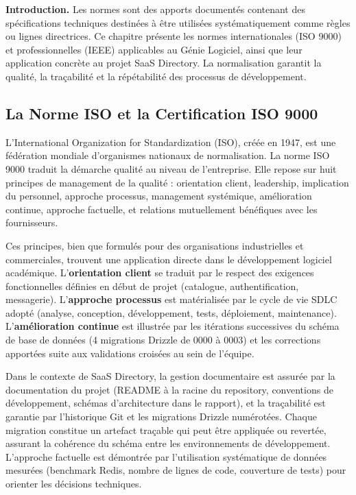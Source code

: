 \textbf{Introduction.} Les normes sont des apports documentés contenant des spécifications techniques destinées à être utilisées systématiquement comme règles ou lignes directrices. Ce chapitre présente les normes internationales (ISO 9000) et professionnelles (IEEE) applicables au Génie Logiciel, ainsi que leur application concrète au projet SaaS Directory. La normalisation garantit la qualité, la traçabilité et la répétabilité des processus de développement.

\subsection{La Norme ISO et la Certification ISO 9000}

L'International Organization for Standardization (ISO), créée en 1947, est une fédération mondiale d'organismes nationaux de normalisation. La norme ISO 9000 traduit la démarche qualité au niveau de l'entreprise. Elle repose sur huit principes de management de la qualité : orientation client, leadership, implication du personnel, approche processus, management systémique, amélioration continue, approche factuelle, et relations mutuellement bénéfiques avec les fournisseurs.

Ces principes, bien que formulés pour des organisations industrielles et commerciales, trouvent une application directe dans le développement logiciel académique. L'\textbf{orientation client} se traduit par le respect des exigences fonctionnelles définies en début de projet (catalogue, authentification, messagerie). L'\textbf{approche processus} est matérialisée par le cycle de vie SDLC adopté (analyse, conception, développement, tests, déploiement, maintenance). L'\textbf{amélioration continue} est illustrée par les itérations successives du schéma de base de données (4 migrations Drizzle de 0000 à 0003) et les corrections apportées suite aux validations croisées au sein de l'équipe.

Dans le contexte de SaaS Directory, la gestion documentaire est assurée par la documentation du projet (README à la racine du repository, conventions de développement, schémas d'architecture dans le rapport), et la traçabilité est garantie par l'historique Git et les migrations Drizzle numérotées. Chaque migration constitue un artefact traçable qui peut être appliquée ou revertée, assurant la cohérence du schéma entre les environnements de développement. L'approche factuelle est démontrée par l'utilisation systématique de données mesurées (benchmark Redis, nombre de lignes de code, couverture de tests) pour orienter les décisions techniques.

